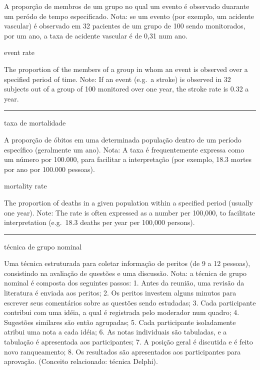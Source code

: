 \documentclass[
  openany]{book}
\begin{document}
A proporção de membros de um grupo no qual um evento é observado duarante um peródo de tempo especificado. Nota: se um evento (por exemplo, um acidente vascular) é observado em 32 pacientes de um grupo de 100 sendo monitorados, por um ano, a taxa de acidente vascular é de 0,31 num ano.

event rate

The proportion of the members of a group in whom an event is observed over a specified period of time. Note: If an event (e.g.~a stroke) is observed in 32 subjects out of a group of 100 monitored over one year, the stroke rate is 0.32 a year.

\begin{center}\rule{0.5\linewidth}{0.5pt}\end{center}

taxa de mortalidade

A proporção de óbitos em uma determinada população dentro de um período específico (geralmente um ano). Nota: A taxa é frequentemente expressa como um número por 100.000, para facilitar a interpretação (por exemplo, 18.3 mortes por ano por 100.000 pessoas).

mortality rate

The proportion of deaths in a given population within a specified period (usually one year). Note: The rate is often expressed as a number per 100,000, to facilitate interpretation (e.g.~18.3 deaths per year per 100,000 persons).

\begin{center}\rule{0.5\linewidth}{0.5pt}\end{center}

técnica de grupo nominal

Uma técnica estruturada para coletar informação de peritos (de 9 a 12 pessoas), consistindo na avaliação de questões e uma discussão. Nota: a técnica de grupo nominal é composta dos seguintes passos: 1. Antes da reunião, uma revisão da literatura é enviada aos peritos; 2. Os peritos investem alguns minutos para escrever seus comentários sobre as questões sendo estudadas; 3. Cada participante contribui com uma idéia, a qual é registrada pelo moderador num quadro; 4. Sugestões similares são então agrupadas; 5. Cada participante isoladamente atribui uma nota a cada idéia; 6. As notas individuais são tabuladas, e a tabulação é apresentada aos participantes; 7. A posição geral é discutida e é feito novo ranqueamento; 8. Os resultados são apresentados aos participantes para aprovação. (Conceito relacionado: técnica Delphi).
\end{document}
